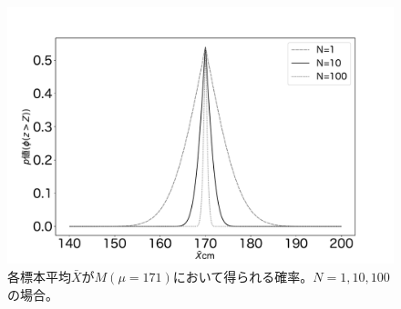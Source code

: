 \begin{figure}
\begin{center}
   \includegraphics[width=15cm]{./image/04_/p_cm.pdf}
   \caption{各標本平均$\bar{X}$が$M(\mu=171)$において得られる確率。$N=1,10,100$の場合。}
   \label{fig:p_cm}
 \end{center}
\end{figure}









